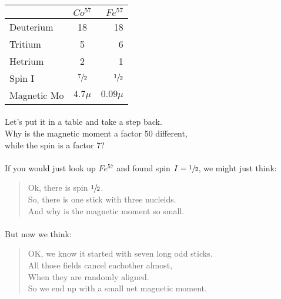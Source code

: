 \begin{center}
  \begin{tabular}{ | l || c | r |}
    \hline
     & $Co^{57}$ & $Fe^{57}$ \\ \hline\hline 
    Deuterium & 18 & 18 \\ \hline 
    Tritium & 5 & 6 \\ \hline 
    Hetrium & 2 & 1 \\ \hline 
    Spin I & $\sfrac{7}{2}$ & $\sfrac{1}{2}$ \\ \hline 
    Magnetic Mo & $4.7\mu$ & $0.09\mu$ \\ \hline 
    \hline
  \end{tabular}
\end{center}
\paragraph{}
Let's put it in a table and take a step back.\\
Why is the magnetic moment a factor 50 different,\\ 
while the spin is a factor 7?

\paragraph{}
If you would just look up $Fe^{57}$ and found spin $I = \sfrac{1}{2}$, we might just think: 
\begin{quotation}
Ok, there is spin $\sfrac{1}{2}$.\\
So, there is one stick with three nucleids.\\
And why is the magnetic moment so small.
\end{quotation}

\paragraph{}
But now we think:
\begin{quotation}
OK, we know it started with seven long odd sticks.\\
All those fields cancel eachother almost,\\
When they are randomly aligned.\\
So we end up with a small net magnetic moment.
\end{quotation}




